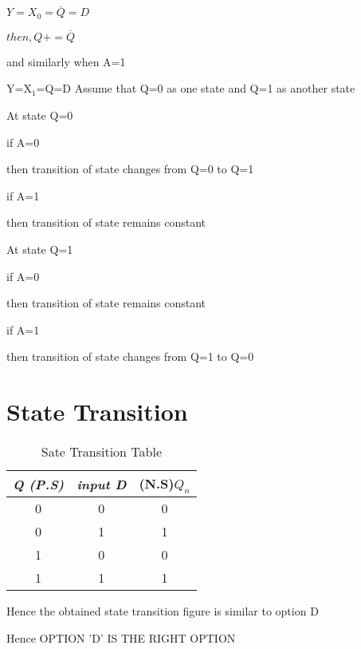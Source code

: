 \documentclass[standalone]{article}
\begin{document}
    $ Y=X_0=\overline{Q}=D$
     
    $ then,Q+  =\overline{Q}$
    
    and  similarly  when  A=1
    
    Y=X$_1$=Q=D
   Assume   that  Q=0  as one  state and Q=1  as another state
   
   At  state Q=0
   
    if  A=0
    
    then transition of state changes from Q=0 to Q=1
    
    if A=1
    
    then transition of state remains constant
    
   At  state  Q=1
   
    if  A=0
    
    then transition of state remains constant
    
    if A=1
    
    then transition of state changes from Q=1 to Q=0
    
\section{State Transition}  
  \begin{table}[h]
   \centering
   \begin{tabular}{|c|c|c|}
   \hline
   \textit{\textbf{Q (P.S) }}&\textit{\textbf{input D}} &\textbf{(N.S)$Q_n$} \\ \hline
    0 & 0    &  0     \\ \hline
    0 & 1    &  1     \\ \hline
    1 & 0    &  0     \\\hline
    1 & 1    &  1     \\ \hline
    \hline
   \end{tabular}
  \caption{Sate Transition Table }
\label{tab:table1}
\end{table}
 
    Hence the obtained state transition figure is similar to option D
    
    Hence  OPTION 'D' IS THE RIGHT OPTION
    
\begin{figure}[h]
    \centering
     
\end{figure}
\end{document}
